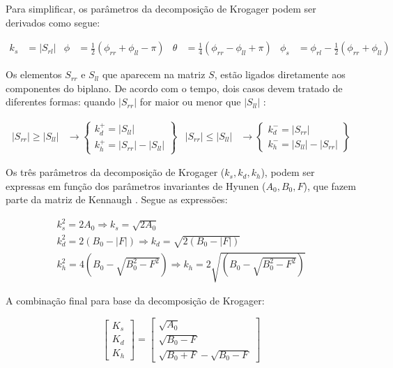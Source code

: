 \documentclass{article}
\begin{document}
Para simplificar, os parâmetros da decomposição de Krogager podem ser derivados como segue:

\begin{align}
    k_{s} &= |S_{rl}| &
    \phi &= \frac{1}{2} (\phi_{rr}+\phi_{ll}-\pi) &
    \theta &= \frac{1}{4} (\phi_{rr}-\phi_{ll}+\pi) &
    \phi_{s} &= \phi_{rl}-\frac{1}{2} (\phi_{rr}+\phi_{ll})
\end{align}

Os elementos $S_{rr}$ e $S_{ll}$ que aparecem na matriz $S$, estão ligados diretamente aos componentes do biplano. De acordo com o tempo, dois casos devem tratado de diferentes formas: quando  $|S_{rr}|$ for maior ou menor que $|S_{ll}|$ \cite{jong:2009}:

\begin{align}
    |S_{rr}|\geq|S_{ll}| &\rightarrow
	\begin{Bmatrix}
    	k^+_{d}=|S_{ll}| \\
    	k^+_{h}=|S_{rr}|-|S_{ll}|
	\end{Bmatrix} & 
	|S_{rr}|\leq|S_{ll}| &\rightarrow 
	\begin{Bmatrix}
    	k^-_{d}=|S_{rr}| \\
    	k^-_{h}=|S_{ll}|-|S_{rr}|
	\end{Bmatrix}
\end{align}

Os três parâmetros da decomposição de Krogager ($k_{s}, k_{d}, k_{h}$), podem ser expressas em função dos parâmetros invariantes de Hyunen ($A_{0}, B_{0}, F$), que fazem parte da matriz de Kennaugh \cite{jong:2009}. Segue as expressões:

\begin{equation}
    \begin{split}
            k^2_{s} = 2A_{0} \Rightarrow k_{s} = \sqrt{2A_{0}} \\ k^2_{d} = 2(B_{0}-|F|) \Rightarrow k_{d} = \sqrt{2(B_{0}-|F|)} \\
            k^2_{h} = 4(B_{0}-\sqrt{B^2_{0}-F^2}) \Rightarrow k_{h} = 2\sqrt{(B_{0}-\sqrt{B^2_{0}-F^2})}
    \end{split}
\end{equation}

A combinação final para base da decomposição de Krogager:

\begin{equation}
    \begin{bmatrix}
        K_{s} \\
	    K_{d}\\
	    K_{h}
    \end{bmatrix} = 
    \begin{bmatrix}
        \sqrt{A_{0}} \\
	    \sqrt{B_{0}-F} \\
	    \sqrt{B_{0}+F} - \sqrt{B_{0}-F}
    \end{bmatrix}
\end{equation}
\end{document}
